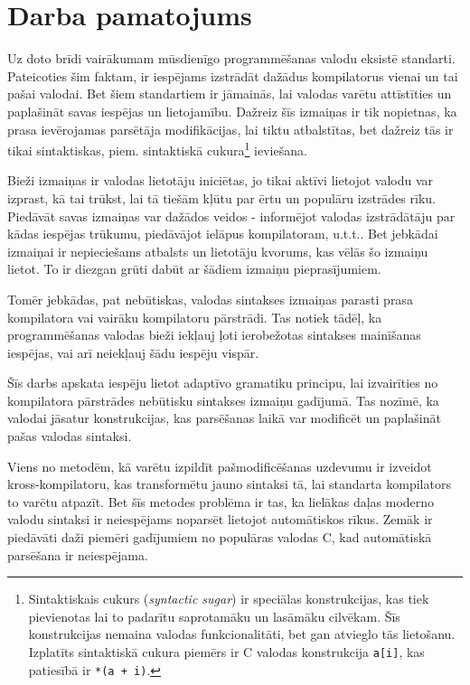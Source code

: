 \section{\label{s:motivation}Darba pamatojums}

Uz doto brīdi vairākumam mūsdienīgo programmēšanas valodu eksistē standarti. Pateicoties šim faktam, ir iespējams izstrādāt dažādus kompilatorus vienai un tai pašai valodai. Bet šiem standartiem ir jāmainās, lai valodas varētu attīstīties un paplašināt savas iespējas un lietojamību. Dažreiz šīs izmaiņas ir tik nopietnas, ka prasa ievērojamas parsētāja modifikācijas, lai tiktu atbalstītas, bet dažreiz tās ir tikai sintaktiskas, piem. sintaktiskā cukura\footnote{Sintaktiskais cukurs (\emph{syntactic sugar}) ir speciālas konstrukcijas, kas tiek pievienotas lai to padarītu saprotamāku un lasāmāku cilvēkam. Šīs konstrukcijas nemaina valodas funkcionalitāti, bet gan atvieglo tās lietošanu. Izplatīts sintaktiskā cukura piemērs ir C valodas konstrukcija \texttt{a[i]}, kas patiesībā ir \texttt{*(a + i)}.} ieviešana.

Bieži izmaiņas ir valodas lietotāju iniciētas, jo tikai aktīvi lietojot valodu var izprast, kā tai trūkst, lai tā tiešām kļūtu par ērtu un populāru izstrādes rīku. Piedāvāt savas izmaiņas var dažādos veidos - informējot valodas izstrādātāju par kādas iespējas trūkumu, piedāvājot ielāpus kompilatoram, u.t.t.. Bet jebkādai izmaiņai ir nepieciešams atbalsts un lietotāju kvorums, kas vēlās šo izmaiņu lietot. To ir diezgan grūti dabūt ar šādiem izmaiņu pieprasījumiem.

Tomēr jebkādas, pat nebūtiskas, valodas sintakses izmaiņas parasti prasa kompilatora vai vairāku kompilatoru pārstrādi. Tas notiek tādēļ, ka programmēšanas valodas bieži iekļauj ļoti ierobežotas sintakses mainīšanas iespējas, vai arī neiekļauj šādu iespēju vispār. 

Šīs darbs apskata iespēju lietot adaptīvo gramatiku principu, lai izvairīties no kompilatora pārstrādes nebūtisku sintakses izmaiņu gadījumā. Tas nozīmē, ka valodai jāsatur konstrukcijas, kas parsēšanas laikā var modificēt un paplašināt pašas valodas sintaksi.

Viens no metodēm, kā varētu izpildīt pašmodificēšanas uzdevumu ir izveidot kross\--kom\-pi\-la\-to\-ru, kas transformētu jauno sintaksi tā, lai standarta kompilators to varētu atpazīt. Bet šīs metodes problēma ir tas, ka lielākas daļas moderno valodu sintaksi ir neiespējams noparsēt lietojot automātiskos rīkus. Zemāk ir piedāvāti daži piemēri gadījumiem no populāras valodas C, kad automātiskā parsēšana ir neiespējama.


